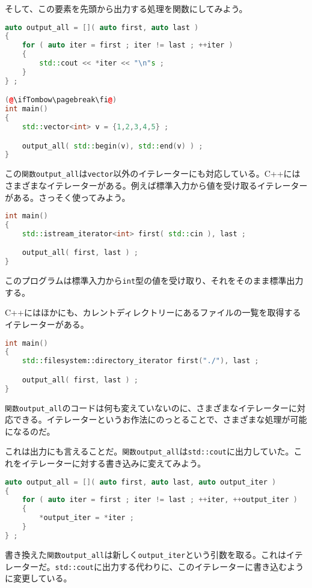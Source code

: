 そして、この要素を先頭から出力する処理を関数にしてみよう。

\begin{lstlisting}[language={C++}]
auto output_all = []( auto first, auto last )
{
    for ( auto iter = first ; iter != last ; ++iter )
    {
        std::cout << *iter << "\n"s ;
    }
} ;

(@\ifTombow\pagebreak\fi@)
int main()
{
    std::vector<int> v = {1,2,3,4,5} ;

    output_all( std::begin(v), std::end(v) ) ;
}
\end{lstlisting}

この\texttt{関数output\_all}は\texttt{vector}以外のイテレーターにも対応している。C++にはさまざまなイテレーターがある。例えば標準入力から値を受け取るイテレーターがある。さっそく使ってみよう。

\begin{lstlisting}[language={C++}]
int main()
{
    std::istream_iterator<int> first( std::cin ), last ;

    output_all( first, last ) ;
}
\end{lstlisting}

このプログラムは標準入力から\texttt{int}型の値を受け取り、それをそのまま標準出力する。

C++にはほかにも、カレントディレクトリーにあるファイルの一覧を取得するイテレーターがある。

\begin{lstlisting}[language={C++}]
int main()
{
    std::filesystem::directory_iterator first("./"), last ;

    output_all( first, last ) ;
}
\end{lstlisting}

\texttt{関数output\_all}のコードは何も変えていないのに、さまざまなイテレーターに対応できる。イテレーターというお作法にのっとることで、さまざまな処理が可能になるのだ。

これは出力にも言えることだ。\texttt{関数output\_all}は\texttt{std::cout}に出力していた。これをイテレーターに対する書き込みに変えてみよう。

\begin{lstlisting}[language={C++}]
auto output_all = []( auto first, auto last, auto output_iter )
{
    for ( auto iter = first ; iter != last ; ++iter, ++output_iter )
    {
        *output_iter = *iter ;
    }
} ;
\end{lstlisting}

書き換えた\texttt{関数output\_all}は新しく\texttt{output\_iter}という引数を取る。これはイテレーターだ。\texttt{std::cout}に出力する代わりに、このイテレーターに書き込むように変更している。


